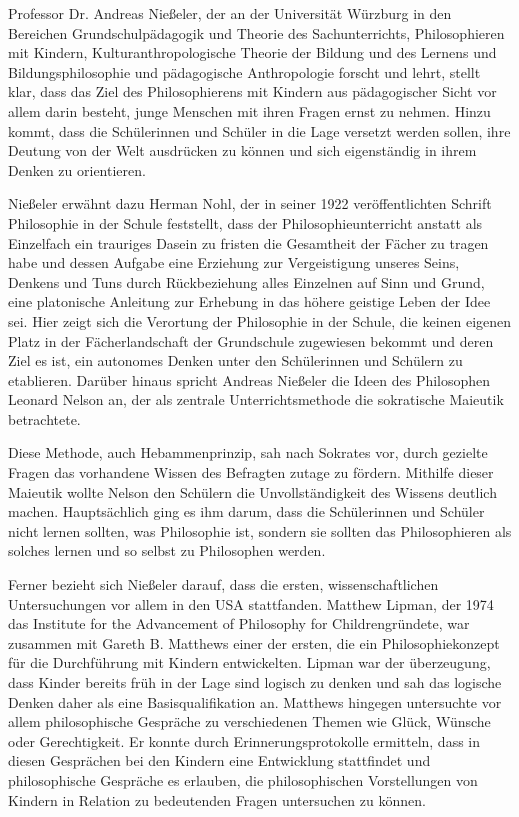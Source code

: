 Professor Dr. Andreas Nießeler, der an der Universität Würzburg in den Bereichen Grundschulpädagogik und Theorie des Sachunterrichts, Philosophieren mit Kindern, Kulturanthropologische Theorie der Bildung und des Lernens und Bildungsphilosophie und pädagogische Anthropologie forscht und lehrt, stellt klar, dass das Ziel des Philosophierens mit Kindern aus pädagogischer Sicht vor allem darin besteht, \glqq junge Menschen mit ihren Fragen ernst zu nehmen\grqq{}\cite{AN13, S.617}.
Hinzu kommt, dass die Schülerinnen und Schüler in die Lage versetzt werden sollen, ihre Deutung von der Welt ausdrücken zu können und sich eigenständig in ihrem Denken zu orientieren. 

Nießeler erwähnt dazu Herman Nohl, der in seiner 1922 veröffentlichten Schrift \glqq Philosophie in der Schule\grqq{} feststellt, dass der Philosophieunterricht \glqq anstatt als Einzelfach ein trauriges Dasein zu fristen die Gesamtheit der Fächer zu tragen habe und dessen Aufgabe eine Erziehung zur \glqq Vergeistigung unseres Seins, Denkens und Tuns durch Rückbeziehung alles Einzelnen auf Sinn und Grund, eine platonische Anleitung zur Erhebung in das höhere geistige Leben der Idee\grqq{} sei.\grqq{}\cite{AN13, S.618}
Hier zeigt sich die Verortung der Philosophie in der Schule, die keinen eigenen Platz in der Fächerlandschaft der Grundschule zugewiesen bekommt und deren Ziel es ist, ein autonomes Denken unter den Schülerinnen und Schülern zu etablieren. 
Darüber hinaus spricht Andreas Nießeler die Ideen des Philosophen Leonard Nelson an, der als zentrale Unterrichtsmethode die sokratische Maieutik betrachtete. 

Diese Methode, auch Hebammenprinzip, sah nach Sokrates vor, durch gezielte Fragen das vorhandene Wissen des Befragten zutage zu fördern. 
Mithilfe dieser Maieutik wollte Nelson den Schülern die Unvollständigkeit des Wissens deutlich machen. 
Hauptsächlich ging es ihm darum, dass die Schülerinnen und Schüler nicht lernen sollten, was Philosophie ist, sondern sie sollten das Philosophieren als solches lernen und so selbst zu Philosophen werden\cite{AN13, S.618}. 

Ferner bezieht sich Nießeler darauf, dass die ersten, wissenschaftlichen Untersuchungen vor allem in den USA stattfanden. 
Matthew Lipman, der 1974 das \glqq Institute for the Advancement of Philosophy for Children\grqq gründete, war zusammen mit Gareth B. Matthews einer der ersten, die ein Philosophiekonzept für die Durchführung mit Kindern entwickelten. 
Lipman war der überzeugung, dass Kinder bereits früh in der Lage sind logisch zu denken und sah das logische Denken daher als eine Basisqualifikation an\cite{AN13, S.619}. 
Matthews hingegen untersuchte vor allem philosophische Gespräche zu verschiedenen Themen wie \glqq Glück\grqq{}, \glqq Wünsche\grqq{} oder \glqq Gerechtigkeit\grqq{}. 
Er konnte durch Erinnerungsprotokolle ermitteln, dass in diesen Gesprächen bei den Kindern eine Entwicklung stattfindet und philosophische Gespräche es erlauben, die philosophischen Vorstellungen von Kindern in Relation zu bedeutenden Fragen untersuchen zu können.

